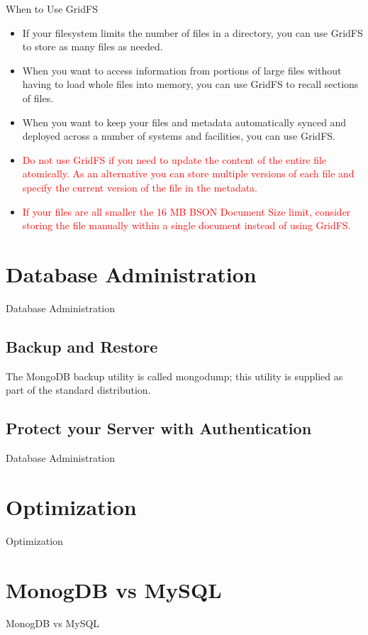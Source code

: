 \documentclass{beamer}
\begin{document}
\begin{frame}{When to Use GridFS}
    \begin{itemize}
        \item If your filesystem limits the number of files in a directory, you can use GridFS to store as many files as needed.
        \item When you want to access information from portions of large files without having to load whole files into memory, you can use GridFS to recall sections of files.
        \item When you want to keep your files and metadata automatically synced and deployed across a number of systems and facilities, you can use GridFS.
        \item \textcolor{red}{Do not use GridFS if you need to update the content of the entire file atomically. As an alternative you can store multiple versions of each file and specify the current version of the file in the metadata. }
        \item \textcolor{red}{If your files are all smaller the 16 MB BSON Document Size limit, consider storing the file manually within a single document instead of using GridFS.}
    \end{itemize}
\end{frame}

\section{Database Administration}
\begin{frame}{Database Administration}
\subsection{Backup and Restore}
The MongoDB backup utility is called mongodump; this utility is supplied as part of the standard distribution.
\end{frame}

\subsection{Protect your Server with  Authentication}
\begin{frame}{Database Administration}
    
\end{frame}

\section{Optimization}
\begin{frame}{Optimization}
    
\end{frame}

\section{MonogDB vs MySQL}
\begin{frame}{MonogDB vs MySQL}
    
\end{frame}
\end{document}
